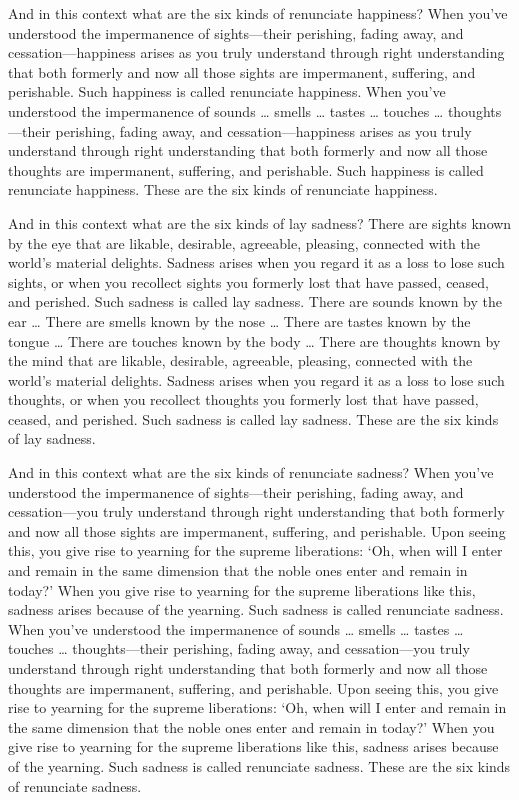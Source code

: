 \documentclass[12pt,openany]{book}%
\begin{document}
And in this context what are the six kinds of renunciate happiness? When you’ve understood the impermanence of sights—their perishing, fading away, and cessation—happiness arises as you truly understand through right understanding that both formerly and now all those sights are impermanent, suffering, and perishable. Such happiness is called renunciate happiness. When you’ve understood the impermanence of sounds … smells … tastes … touches … thoughts—their perishing, fading away, and cessation—happiness arises as you truly understand through right understanding that both formerly and now all those thoughts are impermanent, suffering, and perishable. Such happiness is called renunciate happiness. These are the six kinds of renunciate happiness. 

And in this context what are the six kinds of lay sadness? There are sights known by the eye that are likable, desirable, agreeable, pleasing, connected with the world’s material delights. Sadness arises when you regard it as a loss to lose such sights, or when you recollect sights you formerly lost that have passed, ceased, and perished. Such sadness is called lay sadness. There are sounds known by the ear … There are smells known by the nose … There are tastes known by the tongue … There are touches known by the body … There are thoughts known by the mind that are likable, desirable, agreeable, pleasing, connected with the world’s material delights. Sadness arises when you regard it as a loss to lose such thoughts, or when you recollect thoughts you formerly lost that have passed, ceased, and perished. Such sadness is called lay sadness. These are the six kinds of lay sadness. 

And in this context what are the six kinds of renunciate sadness? When you’ve understood the impermanence of sights—their perishing, fading away, and cessation—you truly understand through right understanding that both formerly and now all those sights are impermanent, suffering, and perishable. Upon seeing this, you give rise to yearning for the supreme liberations: ‘Oh, when will I enter and remain in the same dimension that the noble ones enter and remain in today?’ When you give rise to yearning for the supreme liberations like this, sadness arises because of the yearning. Such sadness is called renunciate sadness. When you’ve understood the impermanence of sounds … smells … tastes … touches … thoughts—their perishing, fading away, and cessation—you truly understand through right understanding that both formerly and now all those thoughts are impermanent, suffering, and perishable. Upon seeing this, you give rise to yearning for the supreme liberations: ‘Oh, when will I enter and remain in the same dimension that the noble ones enter and remain in today?’ When you give rise to yearning for the supreme liberations like this, sadness arises because of the yearning. Such sadness is called renunciate sadness. These are the six kinds of renunciate sadness. 
\end{document}
